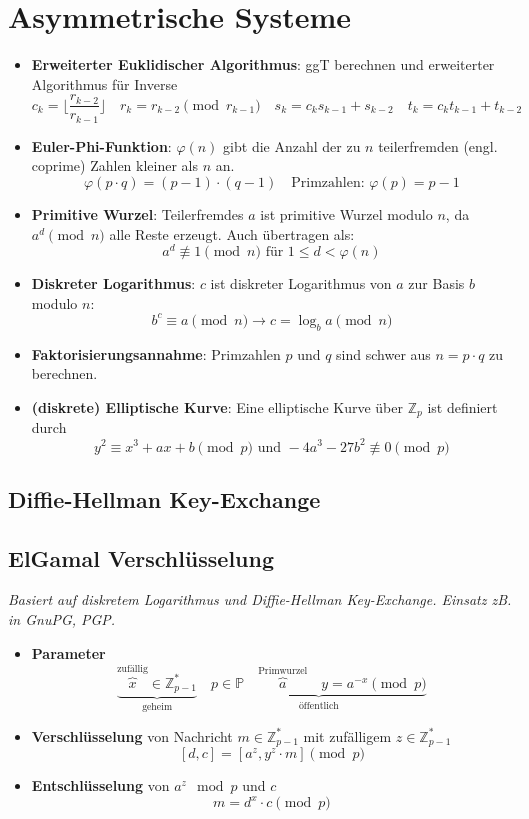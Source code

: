 \documentclass{article}
\begin{document}

\section{Asymmetrische Systeme}
\begin{itemize}
  \item \textbf{Erweiterter Euklidischer Algorithmus}: ggT berechnen und erweiterter Algorithmus für Inverse
    \[ c_k=\lfloor\frac{r_{k-2}}{r_{k-1}}\rfloor \quad r_k = r_{k-2} \pmod{r_{k-1}} \quad s_k=c_ks_{k-1}+s_{k-2} \quad t_k=c_kt_{k-1}+t_{k-2} \]
  \item \textbf{Euler-Phi-Funktion}: $\varphi(n)$ gibt die Anzahl der zu $n$ teilerfremden (engl. coprime) Zahlen kleiner als $n$ an.
    \[ \varphi(p \cdot q) = (p-1) \cdot (q-1) \quad \text{Primzahlen: }\varphi(p) = p-1 \]
  \item \textbf{Primitive Wurzel}: Teilerfremdes $a$ ist primitive Wurzel modulo $n$, da $a^d \pmod{n}$ alle Reste erzeugt. Auch übertragen als:
    \[ a^d \not\equiv 1 \pmod{n} \text{ für } 1 \leq d < \varphi(n) \]
  \item \textbf{Diskreter Logarithmus}: $c$ ist diskreter Logarithmus von $a$ zur Basis $b$ modulo $n$:
    \[ b^c \equiv a \pmod{n} \to c = \log_b a \pmod{n} \]
  \item \textbf{Faktorisierungsannahme}: Primzahlen $p$ und $q$ sind schwer aus $n=p \cdot q$ zu berechnen.
  \item \textbf{(diskrete) Elliptische Kurve}: Eine elliptische Kurve über $\mathbb{Z}_p$ ist definiert durch
    \[ y^2 \equiv x^3 + ax + b \pmod{p} \text{ und } -4a^3 - 27b^2 \not\equiv 0 \pmod{p} \]
\end{itemize}

\subsection{Diffie-Hellman Key-Exchange}


\subsection{ElGamal Verschlüsselung}
\textit{Basiert auf diskretem Logarithmus und Diffie-Hellman Key-Exchange. Einsatz zB. in GnuPG, PGP.}
\begin{itemize}
  \item \textbf{Parameter}
    \[
      \underbrace{\overbrace{x}^\text{zufällig}\in\mathbb{Z}^*_{p-1}}_\text{geheim}\quad
      \underbrace{p\in\mathbb{P} \quad \overbrace{a}^\text{Primwurzel} \quad y = a^{-x} \pmod{p}}_\text{öffentlich}
    \]
  \item \textbf{Verschlüsselung} von Nachricht $m\in\mathbb{Z}^*_{p-1}$ mit zufälligem $z\in\mathbb{Z}^*_{p-1}$
    \[ [d,c] = [a^z, y^z \cdot m] \pmod{p} \]
  \item \textbf{Entschlüsselung} von $a^z \mod{p}$ und $c$
    \[ m = d^x \cdot c \pmod{p} \]
\end{itemize}
\end{document}
